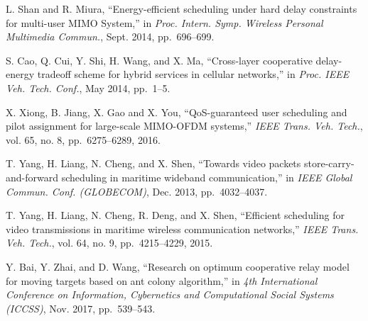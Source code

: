 \documentclass[journal]{IEEEtran}
\begin{document}
\begin{thebibliography}{10}
    
    L. Shan and R. Miura, ``Energy-efficient scheduling under hard delay constraints for multi-user MIMO System,'' in
    \emph{Proc. Intern. Symp. Wireless Personal Multimedia Commun.}, Sept. 2014, pp.~696--699.
    
    S. Cao, Q. Cui, Y. Shi, H. Wang, and X. Ma, ``Cross-layer cooperative delay-energy tradeoff scheme for hybrid services in cellular networks,'' in
    \emph{Proc. IEEE Veh. Tech. Conf.}, May 2014, pp.~1--5.
    
    X. Xiong, B. Jiang, X. Gao and X. You, ``QoS-guaranteed user scheduling and pilot assignment for large-scale MIMO-OFDM systems,''
    \emph{IEEE Trans. Veh. Tech.}, vol. 65, no. 8, pp.~6275--6289, 2016.
    
    
   
    T. Yang, H. Liang, N. Cheng, and X. Shen, 
    ``Towards video packets store-carry-and-forward scheduling in maritime wideband communication,'' in
    \emph{IEEE Global Commun. Conf. (GLOBECOM)}, Dec. 2013, pp.~4032--4037.
   
    T. Yang, H. Liang, N. Cheng, R. Deng, and X. Shen, ``Efficient scheduling for video transmissions in maritime wireless communication networks,'' 
    \emph{IEEE Trans. Veh. Tech.}, vol. 64, no. 9, pp.~4215--4229, 2015.
   
   
    Y. Bai, Y. Zhai, and D. Wang, 
    ``Research on optimum cooperative relay model for moving targets based on ant colony algorithm,'' in
    \emph{4th International Conference on Information, Cybernetics and Computational Social Systems (ICCSS)}, Nov. 2017, pp.~539--543.
   

\end{thebibliography}
\end{document}
